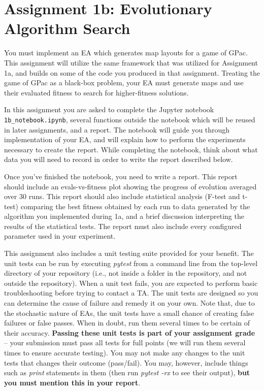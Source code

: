 \documentclass{article}
\begin{document}
\newpage

\section*{Assignment 1b: Evolutionary Algorithm Search}
You must implement an EA which generates map layouts for a game of GPac. This assignment will utilize the same framework that was utilized for Assignment 1a, and builds on some of the code you produced in that assignment. Treating the game of GPac as a black-box problem, your EA must generate maps and use their evaluated fitness to search for higher-fitness solutions.

In this assignment you are asked to complete the Jupyter notebook \texttt{1b\_notebook.ipynb}, several functions outside the notebook which will be reused in later assignments, and a report. The notebook will guide you through implementation of your EA, and will explain how to perform the experiments necessary to create the report. While completing the notebook, think about what data you will need to record in order to write the report described below.

Once you've finished the notebook, you need to write a report. This report should include an evals-vs-fitness plot showing the progress of evolution averaged over 30 runs. This report should also include statistical analysis (F-test and t-test) comparing the best fitness obtained by each run to data generated by the algorithm you implemented during 1a, and a brief discussion interpreting the results of the statistical tests. The report must also include every configured parameter used in your experiment.

This assignment also includes a unit testing suite provided for your benefit. The unit tests can be run by executing \emph{pytest} from a command line from the top-level directory of your repository (i.e., not inside a folder in the repository, and not outside the repository). When a unit test fails, you are expected to perform basic troubleshooting before trying to contact a TA. The unit tests are designed so you can determine the cause of failure and remedy it on your own. Note that, due to the stochastic nature of EAs, the unit tests have a small chance of creating false failures or false passes. When in doubt, run them several times to be certain of their accuracy. \textbf{Passing these unit tests is part of your assignment grade} -- your submission must pass all tests for full points (we will run them several times to ensure accurate testing). You may not make any changes to the unit tests that changes their outcome (pass/fail). You may, however, include things such as \emph{print} statements in them (then run \emph{pytest -rx} to see their output), \textbf{but you must mention this in your report}.
\end{document}
